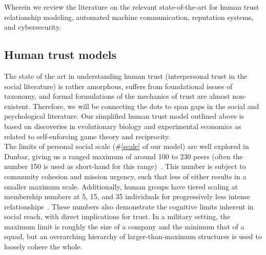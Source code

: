 %
%
%

Wherein we review the literature on the relevant state-of-the-art for human trust relationship modeling, automated machine communication, reputation systems, and cybersecurity.

\subsection{Human trust models}\label{subsec:trust}

The state of the art in understanding human trust (interpersonal trust in the social literature) is rather amorphous, suffers from foundational issues of taxonomy, and formal formulations of the mechanics of trust are almost non-existent.
Therefore, we will be connecting the dots to span gaps in the social and psychological literature.
Our simplified human trust model outlined above is based on discoveries in evolutionary biology and experimental economics as related to self-enforcing game theory and reciprocity.
\\[10pt]
The limits of personal social scale (\#\ref{scale} of our model) are well explored in Dunbar, giving us a ranged maximum of around 100 to 230 peers (often the number 150 is used as short-hand for this range)~\cite{dunbar1992neocortex}.
This number is subject to community cohesion and mission urgency, such that less of either results in a smaller maximum scale.
Additionally, human groups have tiered scaling at membership numbers at 5, 15, and 35 individuals for progressively less intense relationships~\cite{hill2003social}.
These numbers also demonstrate the cognitive limits inherent in social reach, with direct implications for trust.
In a military setting, the maximum limit is roughly the size of a company and the minimum that of a squad, but an overarching hierarchy of larger-than-maximum structures is used to loosely cohere the whole.

